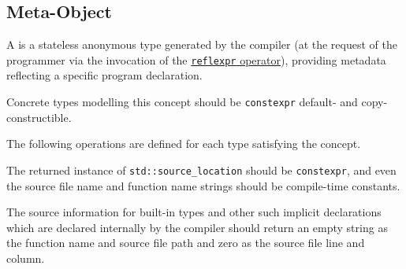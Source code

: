 \subsection{Meta-Object}
\label{concept-Meta-Object}

A  is a stateless anonymous type generated by the compiler
(at the request of the programmer via the invocation of the
\hyperref[section-reflection-operator]{\texttt{reflexpr} operator}),
providing metadata reflecting a specific program declaration.

Concrete types modelling this concept should be \texttt{constexpr} default-
and copy-constructible.





The following operations are defined for each type satisfying the 
concept.



The returned instance of \texttt{std::source\_location} should be \texttt{constexpr},
and even the source file name and function name strings should be compile-time constants.

The source information for built-in types and other
such implicit declarations which are declared internally by the compiler
should return an empty string as the function name and source file path and
zero as the source file line and column.
